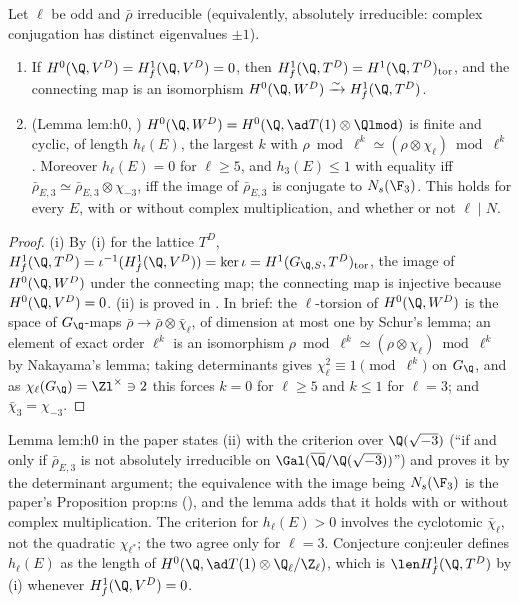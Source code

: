 \begin{proposition}\label{prop:blochkato:h0-selmer}
Let $\ell$ be odd and $\bar\rho$ irreducible (equivalently, absolutely irreducible: complex conjugation has distinct eigenvalues $\pm1$).
\begin{enumerate}[label=(\roman*)]
\item If $H^0(\Q,V^D)=H^1_f(\Q,V^D)=0$, then $H^1_f(\Q,T^D)=H^1(\Q,T^D)_{\mathrm{tor}}$, and the connecting map is an isomorphism $H^0(\Q,W^D)\xrightarrow{\sim}H^1_f(\Q,T^D)$.
\item (Lemma lem:h0, ) $H^0(\Q,W^D)=H^0(\Q,\ad T(1)\otimes\Qlmod)$ is finite and cyclic, of length $h_\ell(E)$, the largest $k$ with $\rho\bmod\ell^k\simeq(\rho\otimes\chi_\ell)\bmod\ell^k$.
Moreover $h_\ell(E)=0$ for $\ell\ge5$, and $h_3(E)\le1$ with equality iff $\bar\rho_{E,3}\simeq\bar\rho_{E,3}\otimes\chi_{-3}$, iff the image of $\bar\rho_{E,3}$ is conjugate to $N_s(\F_3)$. This
holds for every $E$, with or without complex multiplication, and whether or not $\ell\mid N$.
\end{enumerate}
\end{proposition}

\begin{proof}
(i) By (i) for the lattice $T^D$, $H^1_f(\Q,T^D)=\iota^{-1}(H^1_f(\Q,V^D))=\ker\iota=H^1(G_{\Q,S},T^D)_{\mathrm{tor}}$, the image of $H^0(\Q,W^D)$ under the
connecting map; the connecting map is injective because $H^0(\Q,V^D)=0$. (ii) is proved in . In brief: the $\ell$-torsion of $H^0(\Q,W^D)$ is the space of
$G_\Q$-maps $\bar\rho\to\bar\rho\otimes\bar\chi_\ell$, of dimension at most one by Schur's lemma; an element of exact order $\ell^k$ is an isomorphism $\rho\bmod\ell^k\simeq(\rho\otimes\chi_\ell)\bmod\ell^k$ by
Nakayama's lemma; taking determinants gives $\chi_\ell^2\equiv1\pmod{\ell^k}$ on $G_\Q$, and as $\chi_\ell(G_\Q)=\Zl^\times\ni2$ this forces $k=0$ for $\ell\ge5$ and $k\le1$ for $\ell=3$; and
$\bar\chi_3=\chi_{-3}$.
\end{proof}

\begin{paperlink}
Lemma lem:h0 in the paper states (ii) with the criterion over $\Q(\sqrt{-3})$ (``if and only if $\bar\rho_{E,3}$ is not absolutely irreducible on
$\Gal(\overline\Q/\Q(\sqrt{-3}))$'') and proves it by the determinant argument; the equivalence with the image being $N_s(\F_3)$ is the paper's Proposition prop:ns
(), and the lemma adds that it holds with or without complex multiplication. The criterion for $h_\ell(E)>0$ involves the cyclotomic $\bar\chi_\ell$,
not the quadratic $\chi_{\ell^*}$; the two agree only for $\ell=3$. Conjecture conj:euler defines $h_\ell(E)$ as the length of
$H^0(\Q,\ad T(1)\otimes\Q_\ell/\Z_\ell)$, which is $\len H^1_f(\Q,T^D)$ by (i) whenever $H^1_f(\Q,V^D)=0$.
\end{paperlink}

